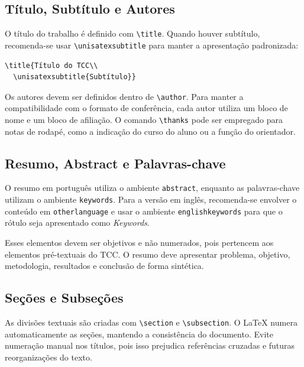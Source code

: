 \subsection{Título, Subtítulo e Autores}
O título do trabalho é definido com \verb|\title|. Quando houver subtítulo, recomenda-se usar \verb|\unisatexsubtitle| para manter a apresentação padronizada:

\begin{verbatim}
\title{Título do TCC\\
  \unisatexsubtitle{Subtítulo}}
\end{verbatim}

Os autores devem ser definidos dentro de \verb|\author|. Para manter a compatibilidade com o formato de conferência, cada autor utiliza um bloco de nome e um bloco de afiliação. O comando \verb|\thanks| pode ser empregado para notas de rodapé, como a indicação do curso do aluno ou a função do orientador.

\subsection{Resumo, Abstract e Palavras-chave}
O resumo em português utiliza o ambiente \verb|abstract|, enquanto as palavras-chave utilizam o ambiente \verb|keywords|. Para a versão em inglês, recomenda-se envolver o conteúdo em \verb|otherlanguage| e usar o ambiente \verb|englishkeywords| para que o rótulo seja apresentado como \textit{Keywords}.

Esses elementos devem ser objetivos e não numerados, pois pertencem aos elementos pré-textuais do TCC. O resumo deve apresentar problema, objetivo, metodologia, resultados e conclusão de forma sintética.

\subsection{Seções e Subseções}
As divisões textuais são criadas com \verb|\section| e \verb|\subsection|. O \LaTeX{} numera automaticamente as seções, mantendo a consistência do documento. Evite numeração manual nos títulos, pois isso prejudica referências cruzadas e futuras reorganizações do texto.

